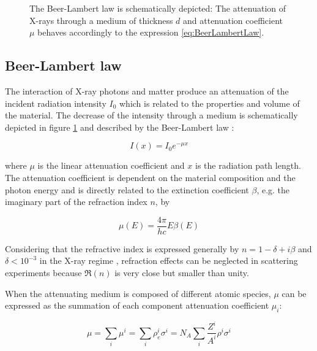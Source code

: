 \begin{figure}[hbt]%
	\centering
	        \def\svgwidth{0.8\linewidth}
		
		\caption[Depiction of the Beer-Lambert law.]{The Beer-Lambert law is schematically depicted: The attenuation of X-rays through a medium of thickness $d$ and attenuation coefficient $\mu$ behaves accordingly to the expression \ref{eq:BeerLambertLaw}.}
		\label{fig:BeerLambertScheme}
\end{figure}


\subsection{Beer-Lambert law}
\label{sec:BeerLambert}

The interaction of X-ray photons and matter produce an attenuation of the incident radiation intensity $I_0$ which is related to the properties and volume of the material. The decrease of the intensity through a medium is schematically depicted in figure \ref{fig:BeerLambertScheme} and described by the Beer-Lambert law \citep{als-nielsen_elements_2011}:

\begin{equation}
        \label{eq:BeerLambertLaw}
        I\left( x \right)=I_0e^{-\mu x}
\end{equation}

where $\mu$ is the linear attenuation coefficient and $x$ is the radiation path length. The attenuation coefficient is dependent on the material composition and the photon energy and is directly related to the extinction coefficient $\beta$, e.g. the imaginary part of the refraction index $n$, by \citep{marr_handbook_1987}

\begin{equation}
        \mu (E) = \frac{4\pi}{hc} E \beta(E)
\end{equation}

Considering that the refractive index is expressed generally by $n = 1 - \delta +i \beta$ and $\delta<10^{-3}$ in the X-ray regime \citep{henke_x-ray_1993}, refraction effects can be neglected in scattering experiments because $\Re(n)$ is very close but smaller than unity.

When the attenuating medium is composed of different atomic species, $\mu$ can be expressed as the summation of each component attenuation coefficient $\mu_i$:

\begin{equation}
        \label{eq:AttenuationMultiComponent}
        \mu = \sum_i \mu^i = \sum_i \rho_e^i \sigma^i  =N_A\sum_i  \frac{Z^i}{A^i} \rho^i \sigma^i
\end{equation}

